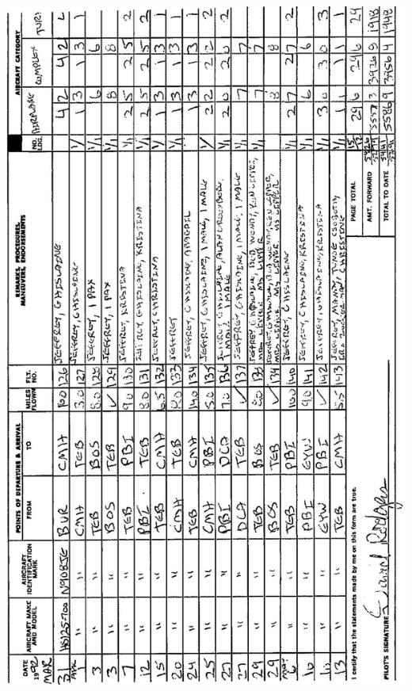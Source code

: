 \documentclass[10pt]{article}
\begin{document}
\includegraphics[max width=\textwidth, center]{2025_02_27_dd68c3d38de88f0516d9g-013}\\
\end{document}
